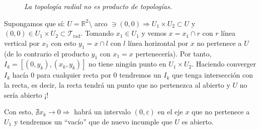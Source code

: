 \begin{ej}
\begin{demo}
\begin{figure}[H]
    \centering
    \caption{\textit{La topología radial no es producto de topologías.}}
\end{figure}

    Supongamos que sí:
    $U = \mathbb{R}^2 \setminus $ arco $\ni \left( 0, 0 \right) \Rightarrow U_1 \times U_2 \subset U$ y $\left( 0, 0 \right) \in U_1 \times U_2 \subset \mathcal{T}_{\text{rad}}$. Tomando $x_1 \in U_1$ y vemos $x = x_1 \cap r$ con $r$ línea vertical por $x_1$ con esto $y_1 = x \cap l$ con $l$ línea horizontal por $x$ no pertenece a $U$ (de lo contrario el producto $y_1$ con $x_1 = x$ pertenecería). Por tanto, $I_k = \left[ \left( 0, y_k \right), \left( x_k, y_k \right) \right]$ no tiene ningún punto en $U_1 \times U_2$. Haciendo converger $I_k$ hacía $0$ para cualquier recta por $0$ tendremos un $I_k$ que tenga intersección con la recta, es decir, la recta tendrá un punto que no pertenezca al abierto y $U$ no sería abierto ¡!

    Con esto, $\nexists x_k \rightarrow 0 \Rightarrow$ habrá un intervalo $\left( 0, \varepsilon \right)$ en el eje $x$ que no pertenece a $U_1$ y tendremos un ``vacío'' que de nuevo incumple que $U$ es abierto.
\end{demo}
\end{ej}

